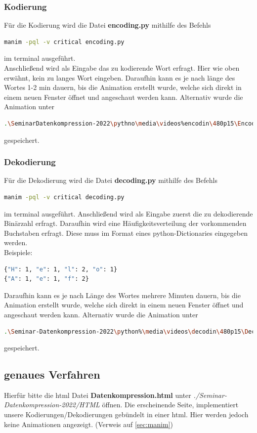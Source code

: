 \documentclass[a4paper]{article}
\theoremstyle{definition}
\theoremstyle{remark}
\begin{document}
\subsubsection{Kodierung}
Für die Kodierung wird die Datei \textbf{encoding.py} mithilfe des Befehls
\begin{lstlisting}[language=bash,
numbers=none]
manim -pql -v critical encoding.py
\end{lstlisting}
im terminal ausgeführt.
\\
Anschließend wird als Eingabe das zu kodierende Wort erfragt. Hier wie oben erwähnt, kein zu langes Wort eingeben.
Daraufhin kann es je nach länge des Wortes 1-2 min dauern, bis die Animation erstellt
wurde, welche sich direkt in einem neuen Fenster öffnet und angeschaut werden kann.
Alternativ wurde die Animation unter
\begin{lstlisting}[language=bash, numbers=none]
.\SeminarDatenkompression-2022\pythno\media\videos%encodin\480p15\Encoding.mp4
\end{lstlisting}
gespeichert.
\newpage
\subsubsection{Dekodierung}
Für die Dekodierung wird die Datei \textbf{decoding.py} mithilfe des Befehls
\begin{lstlisting}[language=bash,
numbers=none]
manim -pql -v critical decoding.py
\end{lstlisting}
im terminal ausgeführt.
Anschließend wird als Eingabe zuerst die zu dekodierende Binärzahl
erfragt. Daraufhin wird eine Häufigkeitsverteilung der vorkommenden Buchstaben erfragt.
Diese muss im Format eines python-Dictionaries eingegeben werden.
\\
Beispiele:
\begin{lstlisting}[language=bash,
numbers=none]
{"H": 1, "e": 1, "l": 2, "o": 1}
{"A": 1, "e": 1, "f": 2}
\end{lstlisting}
Daraufhin kann es je nach Länge des Wortes mehrere Minuten dauern, bis die Animation erstellt wurde, welche sich direkt in einem neuen Fenster öffnet und angeschaut werden kann.
Alternativ wurde die Animation unter
\begin{lstlisting}[language=bash,
numbers=none]
.\Seminar-Datenkompression-2022\python%\media\videos\decodin\480p15\Decoding.mp4
\end{lstlisting}
gespeichert.

\subsection{genaues Verfahren}
\label{sec:genaues-Verfahren}
Hierfür bitte die html Datei \textbf{Datenkompression.html} unter \textit{./Seminar-Datenkompression-2022/HTML} öffnen. Die erscheinende Seite, implementiert unsere Kodierungen/Dekodierungen gebündelt in einer html. Hier werden jedoch keine Animationen angezeigt. (Verweis auf \ref{sec:manim})
\end{document}

